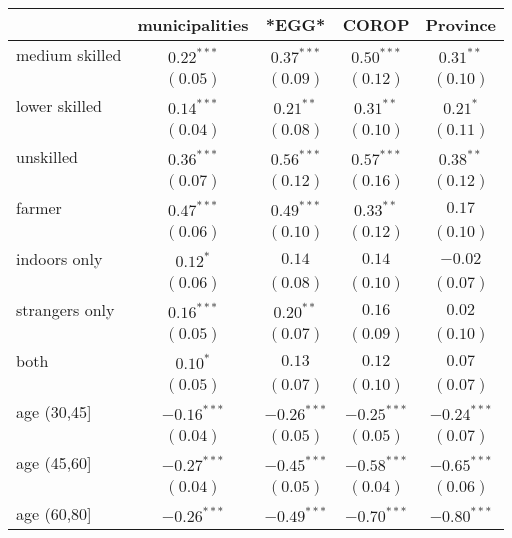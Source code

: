 
\begin{table}
\begin{center}
\begin{tabular}{l c c c c}
\hline
 & municipalities & *EGG* & COROP & Province \\
\hline
medium skilled     & $0.22^{***}$  & $0.37^{***}$  & $0.50^{***}$  & $0.31^{**}$   \\
                   & $(0.05)$      & $(0.09)$      & $(0.12)$      & $(0.10)$      \\
lower skilled      & $0.14^{***}$  & $0.21^{**}$   & $0.31^{**}$   & $0.21^{*}$    \\
                   & $(0.04)$      & $(0.08)$      & $(0.10)$      & $(0.11)$      \\
unskilled          & $0.36^{***}$  & $0.56^{***}$  & $0.57^{***}$  & $0.38^{**}$   \\
                   & $(0.07)$      & $(0.12)$      & $(0.16)$      & $(0.12)$      \\
farmer             & $0.47^{***}$  & $0.49^{***}$  & $0.33^{**}$   & $0.17$        \\
                   & $(0.06)$      & $(0.10)$      & $(0.12)$      & $(0.10)$      \\
indoors only       & $0.12^{*}$    & $0.14$        & $0.14$        & $-0.02$       \\
                   & $(0.06)$      & $(0.08)$      & $(0.10)$      & $(0.07)$      \\
strangers only     & $0.16^{***}$  & $0.20^{**}$   & $0.16$        & $0.02$        \\
                   & $(0.05)$      & $(0.07)$      & $(0.09)$      & $(0.10)$      \\
both               & $0.10^{*}$    & $0.13$        & $0.12$        & $0.07$        \\
                   & $(0.05)$      & $(0.07)$      & $(0.10)$      & $(0.07)$      \\
age (30,45]        & $-0.16^{***}$ & $-0.26^{***}$ & $-0.25^{***}$ & $-0.24^{***}$ \\
                   & $(0.04)$      & $(0.05)$      & $(0.05)$      & $(0.07)$      \\
age (45,60]        & $-0.27^{***}$ & $-0.45^{***}$ & $-0.58^{***}$ & $-0.65^{***}$ \\
                   & $(0.04)$      & $(0.05)$      & $(0.04)$      & $(0.06)$      \\
age (60,80]        & $-0.26^{***}$ & $-0.49^{***}$ & $-0.70^{***}$ & $-0.80^{***}$ \\

\end{tabular}
\end{center}
\end{table}
